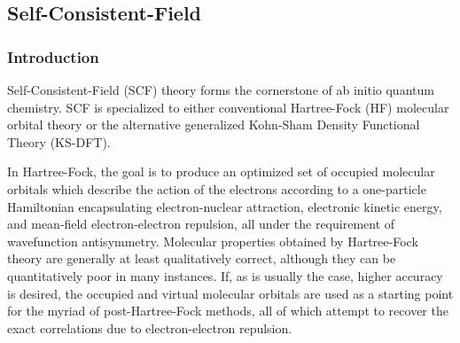 \subsection{Self-Consistent-Field} \label{scf}

\subsubsection{Introduction}

Self-Consistent-Field (SCF) theory forms the cornerstone of ab initio quantum
chemistry. SCF is specialized to either conventional Hartree-Fock (HF) molecular
orbital theory or the alternative generalized Kohn-Sham Density Functional
Theory (KS-DFT). 

In Hartree-Fock, the goal is to produce an optimized set of occupied molecular
orbitals which describe the action of the electrons according to a one-particle
Hamiltonian encapsulating electron-nuclear attraction, electronic kinetic
energy, and mean-field electron-electron repulsion, all under the requirement of
wavefunction antisymmetry. Molecular properties obtained by Hartree-Fock theory
are generally at least qualitatively correct, although they can be
quantitatively poor in many instances. If, as is usually the case, higher
accuracy is desired, the occupied and virtual molecular orbitals are used as a
starting point for the myriad of post-Hartree-Fock methods, all of which attempt
to recover the exact correlations due to electron-electron repulsion.  


